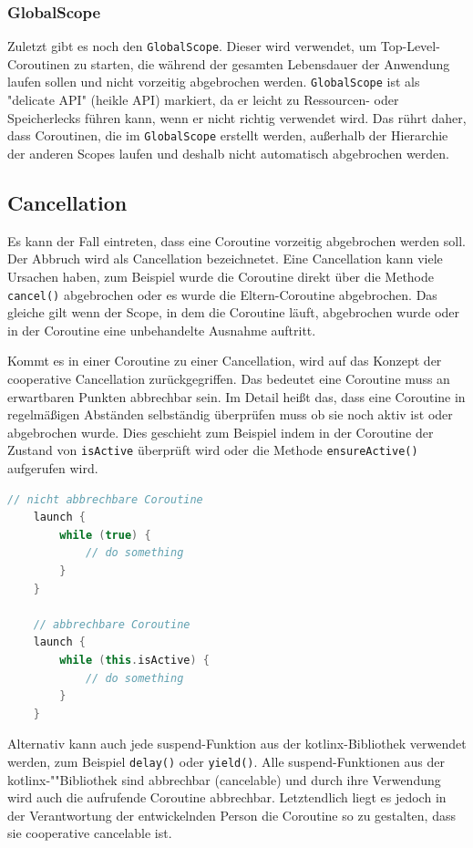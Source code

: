 \documentclass[fontsize=12pt,paper=a4,twoside=semi,parskip=half-,headsepline,headinclude]{scrreprt}
\begin{document}
\subsubsection{GlobalScope}

Zuletzt gibt es noch den \texttt{GlobalScope}. Dieser wird verwendet, um Top-Level-Coroutinen zu starten, die während der gesamten Lebensdauer der Anwendung laufen sollen und nicht vorzeitig abgebrochen werden. \texttt{GlobalScope} ist als "delicate API" (heikle API) markiert, da er leicht zu Ressourcen- oder Speicherlecks führen kann, wenn er nicht richtig verwendet wird. Das rührt daher, dass Coroutinen, die im \texttt{GlobalScope} erstellt werden, außerhalb der Hierarchie der anderen Scopes laufen und deshalb nicht automatisch abgebrochen werden.

\subsection{Cancellation}

Es kann der Fall eintreten, dass eine Coroutine vorzeitig abgebrochen werden soll. Der Abbruch wird als Cancellation bezeichnetet. Eine Cancellation kann viele Ursachen haben, zum Beispiel wurde die Coroutine direkt über die Methode \texttt{cancel()} abgebrochen oder es wurde die Eltern-Coroutine abgebrochen. Das gleiche gilt wenn der Scope, in dem die Coroutine läuft, abgebrochen wurde oder in der Coroutine eine unbehandelte Ausnahme auftritt.

Kommt es in einer Coroutine zu einer Cancellation, wird auf das Konzept der cooperative Cancellation\cite{Cancellation2024} zurückgegriffen. Das bedeutet eine Coroutine muss an erwartbaren Punkten abbrechbar sein. Im Detail heißt das, dass eine Coroutine in regelmäßigen Abständen selbständig überprüfen muss ob sie noch aktiv ist oder abgebrochen wurde. Dies geschieht zum Beispiel indem in der Coroutine der Zustand von \texttt{isActive} überprüft wird oder die Methode \texttt{ensureActive()} aufgerufen wird.

\begin{lstlisting}[language=Kotlin]
	// nicht abbrechbare Coroutine
	launch {
		while (true) {
			// do something
		}
	}

	// abbrechbare Coroutine
	launch {
		while (this.isActive) {
			// do something
		}
	}
\end{lstlisting}

Alternativ kann auch jede suspend-Funktion aus der kotlinx-Bibliothek verwendet werden, zum Beispiel \texttt{delay()} oder \texttt{yield()}. Alle suspend-Funktionen aus der kotlinx-""Bibliothek sind abbrechbar (cancelable) und  durch ihre Verwendung wird auch die aufrufende Coroutine abbrechbar. Letztendlich liegt es jedoch in der Verantwortung der entwickelnden Person die Coroutine so zu gestalten, dass sie cooperative cancelable ist.
\end{document}
